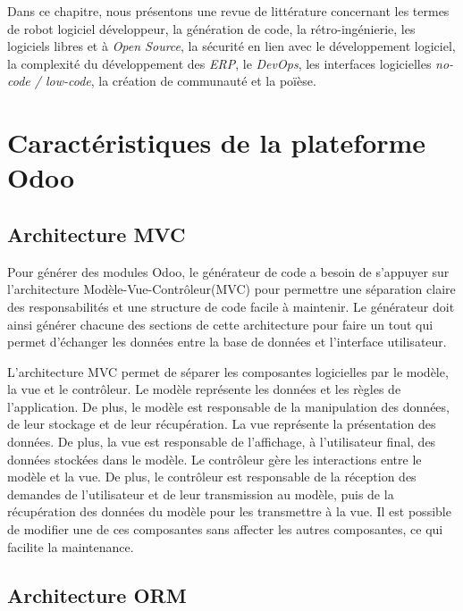 \label{sec:RevLitt}

Dans ce chapitre, nous présentons une revue de littérature concernant les termes de robot logiciel développeur, la génération de code, la rétro-ingénierie, les logiciels libres et à \textit{Open Source}, la sécurité en lien avec le développement logiciel, la complexité du développement des \textit{ERP}, le \textit{DevOps}, les interfaces logicielles \textit{no-code / low-code}, la création de communauté et la poïèse.

\section{Caractéristiques de la plateforme Odoo}

\subsection{Architecture MVC}

Pour générer des modules Odoo, le générateur de code a besoin de s'appuyer sur l'architecture Modèle-Vue-Contrôleur(MVC) pour permettre une séparation claire des responsabilités et une structure de code facile à maintenir. Le générateur doit ainsi générer chacune des sections de cette architecture pour faire un tout qui permet d'échanger les données entre la base de données et l'interface utilisateur.

L’architecture MVC permet de séparer les composantes logicielles par le modèle, la vue et le contrôleur. Le modèle représente les données et les règles de l’application. De plus, le modèle est responsable de la manipulation des données, de leur stockage et de leur récupération. La vue représente la présentation des données. De plus, la vue est responsable de l’affichage, à l’utilisateur final, des données stockées dans le modèle. Le contrôleur gère les interactions entre le modèle et la vue. De plus, le contrôleur est responsable de la réception des demandes de l’utilisateur et de leur transmission au modèle, puis de la récupération des données du modèle pour les transmettre à la vue. Il est possible de modifier une de ces composantes sans affecter les autres composantes, ce qui facilite la maintenance.

\subsection{Architecture ORM}

